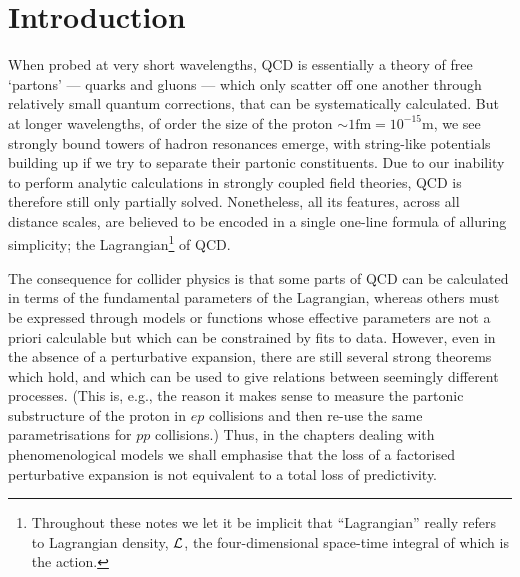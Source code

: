 
\section{Introduction \label{sec:introduction}}

When probed at very short wavelengths, QCD is essentially a theory of
free `partons' --- quarks and gluons --- which only
scatter off one another through relatively small quantum corrections,
that can be systematically calculated. 
But at longer wavelengths, of order the size of the proton $\sim
1\mathrm{fm} = 10^{-15}\mathrm{m}$,  
we see strongly bound towers of hadron resonances emerge, with string-like
potentials building up if we try to separate their partonic
constituents. Due to our
inability to perform analytic calculations in 
strongly coupled field theories, QCD is therefore 
still only partially solved. Nonetheless,  all its features, across all
distance scales, are believed to be encoded in a single one-line
formula of alluring simplicity; the
%
Lagrangian\footnote{Throughout these notes we let it be implicit that
  ``Lagrangian'' really refers to Lagrangian density, ${\cal L}$, the
  four-dimensional space-time integral of which is the action.} of QCD.

The consequence for collider physics is that some parts of QCD can be
calculated in terms of the fundamental parameters of the Lagrangian,
whereas others must be expressed through models or functions whose effective 
parameters are not a priori calculable but which can be constrained
by fits to data. 
However, even in the absence of a
perturbative expansion, there are still several strong theorems which
hold, and which can be used to give relations between seemingly
different processes. (This is, e.g., the reason it makes sense to 
measure the partonic substructure of the proton in $ep$ collisions and
then re-use the same parametrisations for $pp$
collisions.) Thus, in the chapters 
dealing with phenomenological models we shall emphasise that the loss
of a factorised perturbative expansion is not equivalent to a total
loss of predictivity.   

